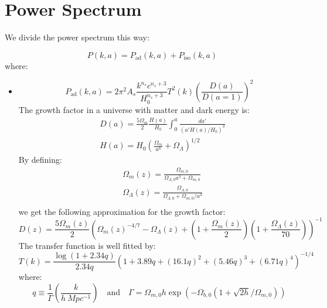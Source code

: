 \documentclass{article}
\begin{document}
\section{Power Spectrum}
We divide the power spectrum this way:

\begin{equation}
    P(k,a) = P_{\text{ad}}(k,a) + P_{\text{iso}}(k,a)
\end{equation}
where:
\begin{itemize}
    \item 
    \begin{equation}
        P_{\text{ad}}(k,a) = 2\pi^2 A_s \frac{k^{n_s}c^{n_s+3}}{H_0^{n_s+3}} T^2(k) \left(\frac{D(a)}{D(a=1)}\right)^2
    \end{equation}
   The growth factor in a universe with matter and dark energy is:
    \begin{equation}
        \begin{split}
             & D(a) = \frac{5 \Omega_m}{2} \frac{H(a)}{H_0} \int_0^a \frac{da'}{(a' H(a)/H_0)^3}\\
             & H(a) = H_0 \left(\frac{\Omega_m}{a^3}+\Omega_\Lambda \right)^{1/2}
        \end{split}
    \end{equation} 
    By defining:
   \begin{equation}
   \begin{split}
    &\Omega_m(z)=\frac{\Omega_{m,0}}{\Omega_{\Lambda,0}a^3+\Omega_{m,0}}\\
    &\Omega_\Lambda(z)=\frac{\Omega_{\Lambda,0}}{\Omega_{\Lambda,0}+\Omega_{m,0}/a^3}\\
   \end{split} 
   \end{equation}
   we get the following approximation for the growth factor:
   \begin{equation}
    D(z)=\frac{5\Omega_m(z)}{2}\left(\Omega_m(z)^{-4/7}-\Omega_\Lambda(z)+\left(1+\frac{\Omega_m(z)}{2}\right)\left(1+\frac{\Omega_\Lambda(z)}{70}\right)\right)^{-1}
   \end{equation}
   The transfer function is well fitted by:
    \begin{equation}
             T(k) = \frac{\log (1+2.34q)}{2.34q}(1+3.89q+(16.1q)^2+(5.46q)^3+(6.71q)^4)^{-1/4}
    \end{equation} 
    where:
    \begin{equation}
        q \equiv \frac{1}{\Gamma}\left(\frac{k}{h \ Mpc^{-1}}\right) \quad \text{and} \quad \Gamma=\Omega_{m,0}h\exp(-\Omega_{b,0}(1+\sqrt{2h}/\Omega_{m,0}))

\end{equation}
\end{itemize}
\end{document}

